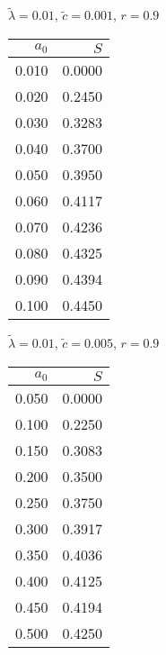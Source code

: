 \documentclass[11pt,a4paper]{article}
\begin{document}
\begin{minipage}[t]{\textwidth}
    \begin{minipage}[t]{0.32\textwidth}
        \footnotesize
        \begin{flushleft}$\tilde{\lambda}=0.01$, $\tilde{c}=0.001$, $r=0.9$\end{flushleft}
        \begin{tabular}[t]{rr}
            $a_0$ & $S$ \\
            \hline
             0.010 & 0.0000 \\
             0.020 & 0.2450 \\
             0.030 & 0.3283 \\
             0.040 & 0.3700 \\
             0.050 & 0.3950 \\
             0.060 & 0.4117 \\
             0.070 & 0.4236 \\
             0.080 & 0.4325 \\
             0.090 & 0.4394 \\
             0.100 & 0.4450 \\
        \end{tabular}
    \end{minipage}
    \begin{minipage}[t]{0.32\textwidth}
        \footnotesize
        \begin{flushleft}$\tilde{\lambda}=0.01$, $\tilde{c}=0.005$, $r=0.9$\end{flushleft}
        \begin{tabular}[t]{rr}
            $a_0$ & $S$ \\
            \hline
             0.050 & 0.0000 \\
             0.100 & 0.2250 \\
             0.150 & 0.3083 \\
             0.200 & 0.3500 \\
             0.250 & 0.3750 \\
             0.300 & 0.3917 \\
             0.350 & 0.4036 \\
             0.400 & 0.4125 \\
             0.450 & 0.4194 \\
             0.500 & 0.4250 \\
        \end{tabular}
    \end{minipage}
    \begin{minipage}[t]{0.32\textwidth}

\end{minipage}
\end{minipage}
\end{document}
